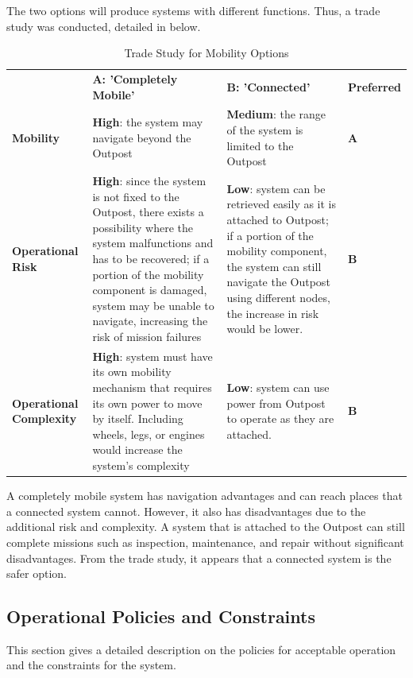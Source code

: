 \documentclass[12pt, letter]{article}
\begin{document}
\begin{enumerate}
{The two options will produce systems with different functions. Thus, a trade study was conducted, detailed in  below.
\begin{table}[H]
\centering
\caption{Trade Study for Mobility Options}
\label{trade_mobility}
\begin{tabular}{|P{3cm}|P{5cm}|P{5cm}|l|}
\hline
	&	\textbf{A: 'Completely Mobile'}	&	\textbf{B: 'Connected'}	&	\textbf{Preferred}	\\\hhline{|=|=|=|=|}
\textbf{Mobility}	&	\textbf{High}: the system may navigate beyond the Outpost	&	\textbf{Medium}: the range of the system is limited to the Outpost	&	\textbf{A}	\\\hline
\textbf{Operational Risk}	&	\textbf{High}: since the system is not fixed to the Outpost, there exists a possibility where the system malfunctions and has to be recovered; if a portion of the mobility component is damaged, system may be unable to navigate, increasing the risk of mission failures	&	\textbf{Low}: system can be retrieved easily as it is attached to Outpost; if a portion of the mobility component, the system can still navigate the Outpost using different nodes, the increase in risk would be lower.\cite{MDA_Carm2}	&	\textbf{B}	\\\hline
\textbf{Operational Complexity}	&	\textbf{High}:  system must have its own mobility mechanism that requires its own power to move by itself. Including wheels, legs, or engines would increase the system's complexity\cite{safety_issues} 	&	\textbf{Low}: system can use power from Outpost to operate as they are attached.\cite{IEEE_Carm}	&	\textbf{B}	\\\hline
\end{tabular}
\end{table}
A completely mobile system has navigation advantages and can reach places that a connected system cannot. However, it also has disadvantages due to the additional risk and complexity. A system that is attached to the Outpost can still complete missions such as inspection, maintenance, and repair without significant disadvantages. From the trade study, it appears that a connected system is the safer option.}
\end{enumerate}
\subsection{Operational Policies and Constraints}
\label{constraints}
This section gives a detailed description on the policies for acceptable operation and the constraints for the system.
\end{document}
